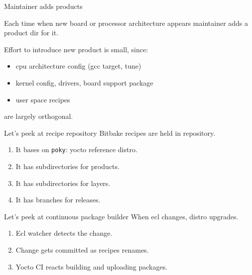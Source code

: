 \documentclass{beamer}
\begin{document}
\begin{frame}[fragile]{Maintainer adds products}
    \begin{block}{}
        Each time when new board or processor architecture
        appears maintainer adds a product dir for it.
    \end{block}
    \begin{block}{}
        \color{green!60!black}
        Effort to introduce new product is small, since:
        \begin{itemize}
            \color{green!60!black}
            \item{cpu architecture config (gcc target, tune)}
            \item{kernel config, drivers, board support package}
            \item{user space recipes}
        \end{itemize}
        are largely orthogonal.
    \end{block}
\end{frame}

\begin{frame}[fragile]{Let's peek at recipe repository \color{blue}{(example)}}
    Bitbake recipes are held in repository.
    \vspace{\baselineskip}
    \begin{enumerate}
        \item{It bases on \verb|poky|: yocto reference distro.}
        \item{It has subdirectories for products.}
        \item{It has subdirectories for layers.}
        \item{It has branches for releases.}
    \end{enumerate}
\end{frame}

\begin{frame}[fragile]{Let's peek at continuous package builder \color{blue}{(example)}}
    When ecl changes, distro upgrades.
    \vspace{\baselineskip}
    \begin{enumerate}
        \item{Ecl watcher detects the change.}
        \item{Change gets committed as recipes renames.}
        \item{Yocto CI reacts building and uploading packages.}
    \end{enumerate}
\end{frame}
\end{document}
